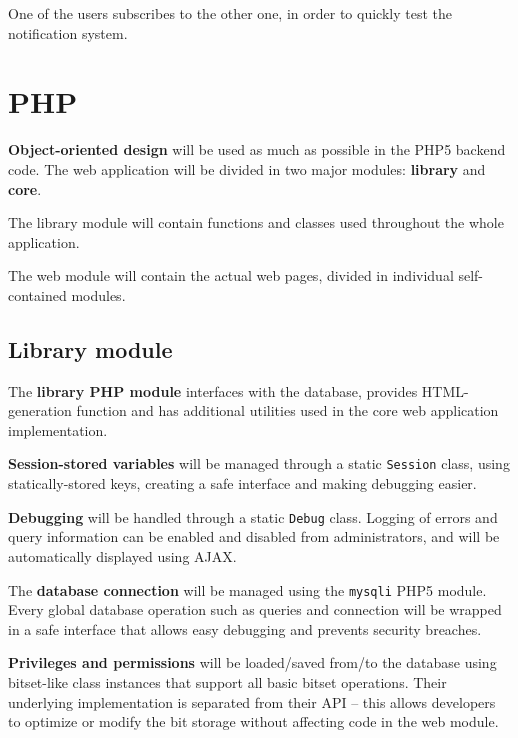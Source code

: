 \documentclass[12pt]{report}
\renewcommand\emph{\textbf}
\begin{document}
                    One of the users subscribes to the other one, in order to quickly test the notification system.

                \newpage

        \chapter{PHP}

            \emph{Object-oriented design} will be used as much as possible in the PHP5 backend code. The web application will be divided in two major modules: \emph{library} and \emph{core}.

            The library module will contain functions and classes used throughout the whole application.
            
            The web module will contain the actual web pages, divided in individual self-contained modules. 

            \section{Library module}

                The \emph{library PHP module} interfaces with the database, provides HTML-generation function and has additional utilities used in the core web application implementation.

                \emph{Session-stored variables} will be managed through a static \texttt{Session} class, using statically-stored keys, creating a safe interface and making debugging easier.

                \emph{Debugging} will be handled through a static \texttt{Debug} class. Logging of errors and query information can be enabled and disabled from administrators, and will be automatically displayed using AJAX.

                The \emph{database connection} will be managed using the \texttt{mysqli} PHP5 module. Every global database operation such as queries and connection will be wrapped in a safe interface that allows easy debugging and prevents security breaches.

                \emph{Privileges and permissions} will be loaded/saved from/to the database using bitset-like class instances that support all basic bitset operations. Their underlying implementation is separated from their API – this allows developers to optimize or modify the bit storage without affecting code in the web module.
\end{document}
